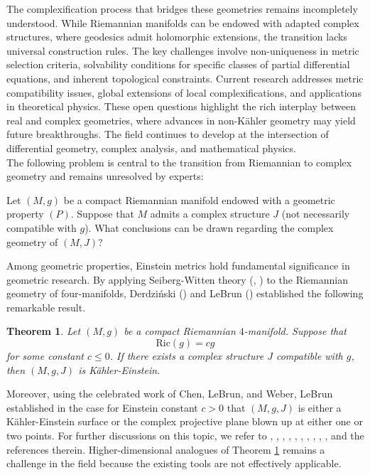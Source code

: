 \documentclass[12pt, reqno]{amsart} \usepackage{pifont} \usepackage{mathrsfs}
\theoremstyle{plain} \newtheorem{thm}{Theorem}[section]
\theoremstyle{definition} \newtheorem{example}[thm]{Example}
\newcommand{\btheorem}{\begin{thm}} \newcommand{\etheorem}{\end{thm}}
\renewcommand{\>}{\rightarrow}
\numberwithin{equation}{section} %
\begin{document}
	The complexification process that bridges these geometries remains incompletely
	understood. While Riemannian manifolds can be endowed with adapted complex
	structures, where geodesics admit holomorphic extensions, the transition lacks
	universal construction rules. The key challenges involve non-uniqueness in
	metric selection criteria, solvability conditions for specific classes of
	partial differential equations, and inherent topological constraints. Current
	research addresses metric compatibility issues, global extensions of local
	complexifications, and applications in theoretical physics. These open
	questions highlight the rich interplay between real and complex geometries,
	where advances in non-K\"ahler geometry may yield future breakthroughs. The
	field continues to develop at the intersection of differential geometry,
	complex analysis, and mathematical physics.\\
	
	 The following problem is central to the transition from Riemannian to
	complex geometry  and remains unresolved by experts:
	\begin{problem}\label{problem}Let $(M,g)$ be a compact Riemannian manifold
		endowed with a geometric property $(P)$. Suppose that $M$ admits a complex
		structure $J$ (not necessarily compatible with $g$). What conclusions
		can be drawn regarding the complex geometry of $(M,  J)$? \end{problem}
	
	\noindent Among geometric properties, Einstein metrics hold fundamental significance in geometric research. By applying Seiberg-Witten theory (\cite{KM94}, \cite{Wit94}) to the Riemannian geometry of
	four-manifolds, Derdzi\'nski (\cite{Der1983}) and  LeBrun
	(\cite{LeBrun1995})  established the following remarkable result.
	
	
	\btheorem\label{LeB}  Let $(M,g)$ be a compact Riemannian $4$-manifold. 
	Suppose that   $$\mathrm{Ric}(g)=cg$$ for some constant $c\leq 0$.  If there
	exists a complex structure $J$ compatible with $g$, then $(M, g,J)$ is
	K\"ahler-Einstein. \etheorem
	
	\noindent Moreover, using the celebrated work \cite{CLW2008} of Chen, LeBrun,
	and Weber,   LeBrun   established in \cite{LeBrun2012} the case for Einstein
	constant $c>0$ that $(M,g, J)$ is either a K\"ahler-Einstein surface or the
	complex projective plane blown up at either one or two points. For further
	discussions on this topic, we refer to \cite{Pedersen1993}, \cite{LeBrun1995},
	\cite{Gauduchon1995}, \cite{Apostolov1999}, \cite{Calderbank1999},
	\cite{LeBrun1996}, \cite{ADM96}, \cite{LeBrun1999}, \cite{AG02},
	\cite{CLW2008}, \cite{LeBrun2012} and the references therein.
	Higher-dimensional analogues of Theorem \ref{LeB} remains a ‌challenge‌ in the
	field because the existing tools are not effectively applicable.\\
	
\end{document}
